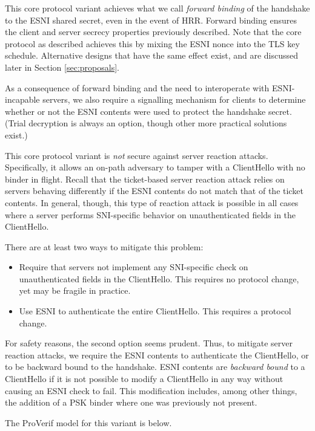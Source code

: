 \documentclass{article}
\theoremstyle{definition}
\theoremstyle{definition}
\begin{document}
This core protocol variant achieves what we call \emph{forward binding} of the handshake to the ESNI 
shared secret, even in the event of HRR. Forward binding ensures the client and server secrecy
properties previously described. Note that the core protocol as described achieves this by mixing
the ESNI nonce into the TLS key schedule. Alternative designs that have the same effect exist,
and are discussed later in Section \ref{sec:proposals}.

As a consequence of forward binding and the need to interoperate with ESNI-incapable servers, 
we also require a signalling mechanism for clients to determine whether or not the ESNI contents were 
used to protect the handshake secret. (Trial decryption is always an option, though other more practical 
solutions exist.)

This core protocol variant is \emph{not} secure against server reaction attacks.
Specifically, it allows an on-path adversary to tamper with a ClientHello with no
binder in flight. Recall that the ticket-based server reaction attack relies on servers
behaving differently if the ESNI contents do not match that of the ticket contents.
In general, though, this type of reaction attack is possible in all cases where a server
performs SNI-specific behavior on unauthenticated fields in the ClientHello. 

There are at least two ways to mitigate this problem:
%
\begin{itemize}
  \item Require that servers not implement any SNI-specific check on unauthenticated fields
  in the ClientHello. This requires no protocol change, yet may be fragile in practice.
  \item Use ESNI to authenticate the entire ClientHello. This requires a protocol change.
\end{itemize}
%

For safety reasons, the second option seems prudent. Thus, to mitigate server reaction attacks,
we require the ESNI contents to authenticate the ClientHello, or to be backward bound to the 
handshake. ESNI contents are \emph{backward bound} to a ClientHello if it is not possible 
to modify a ClientHello in any way without causing an ESNI check to fail. This modification includes,
among other things, the addition of a PSK binder where one was previously not present.

The ProVerif model for this variant is below.
\end{document}

